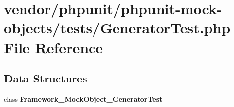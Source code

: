\section{vendor/phpunit/phpunit-\/mock-\/objects/tests/\+Generator\+Test.php File Reference}
\label{_generator_test_8php}
\subsection*{Data Structures}
\begin{DoxyCompactItemize}
\item 
class {\bf Framework\+\_\+\+Mock\+Object\+\_\+\+Generator\+Test}
\end{DoxyCompactItemize}
